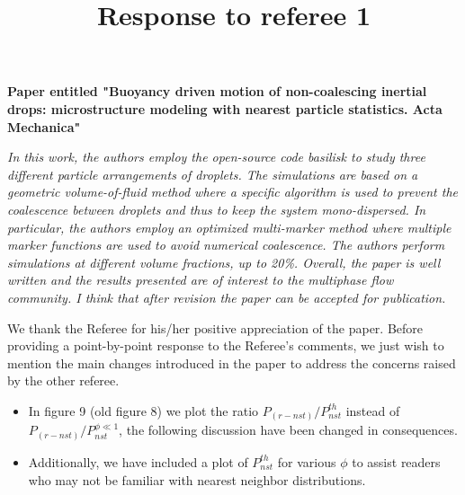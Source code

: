 \documentclass[10pt,a4paper]{article}
\begin{document}
\title{Response to referee 1} 
\maketitle
\textbf{Paper entitled "Buoyancy driven motion of non-coalescing inertial drops: microstructure modeling with nearest particle statistics.
Acta Mechanica"}
\bigskip

\textit{In this work, the authors employ the open-source code basilisk to study three different particle arrangements of droplets. The simulations are based on a geometric volume-of-fluid method where a specific algorithm is used to prevent the coalescence between droplets and thus to keep the system mono-dispersed. In particular, the authors employ an optimized multi-marker method where multiple marker functions are used to avoid numerical coalescence. The authors perform simulations at different volume fractions, up to 20\%. Overall, the paper is well written and the results presented are of interest to the multiphase flow community. I think that after revision the paper can be accepted for publication.}


\color{blue}
We thank the Referee for his/her positive appreciation of the paper. 
Before providing a point-by-point response to the Referee’s comments, we just wish to mention the main changes 
introduced in the paper to address the concerns raised by the other referee.
\begin{itemize}
    \item In figure 9 (old figure 8) we plot the ratio $P_{(r-nst)}/P_{nst}^{th}$ instead of $P_{(r-nst)}/P_{nst}^{\phi\ll 1}$, the following discussion have been changed in consequences. 
    \item Additionally, we have included a plot of $P_{nst}^{th}$ for various $\phi$ to assist readers who may not be familiar with nearest neighbor distributions. 
\end{itemize}

\end{document}
